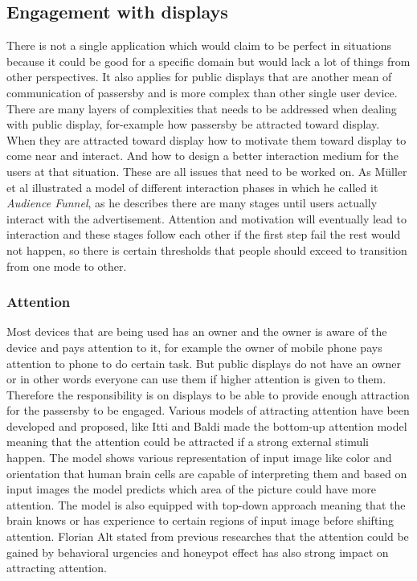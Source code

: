 \subsection{Engagement with displays}
There is not a single application which would claim to be perfect in situations because it could be good for a specific domain but would lack a lot of things from other perspectives. It also applies for public displays that are another mean of communication of passersby and is more complex than other single user device. There are many layers of complexities that needs to be addressed when dealing with public display, for-example how passersby be attracted toward display. When they are attracted toward display how to motivate them toward display to come near and interact. And how to design a better interaction medium for the users at that situation. These are all issues that need to be worked on. As Müller et al \cite{DesignSpace} illustrated a model of different interaction phases in which he called it \emph{Audience Funnel}, as he describes there are many stages until users actually interact with the advertisement. Attention and motivation will eventually lead to interaction and these stages follow each other if the first step fail the rest would not happen, so there is certain thresholds that people should exceed to transition from one mode to other. 


\subsubsection{Attention}
Most devices that are being used has an owner and the owner is aware of the device and pays attention to it, for example the owner of mobile phone pays attention to phone to do certain task. But public displays do not have an owner or in other words everyone can use them if higher attention is given to them. Therefore the responsibility is on displays to be able to provide enough attraction for the passersby to be engaged. 
Various models of attracting attention have been developed and proposed, like Itti and Baldi \cite{attention1} made the bottom-up attention model meaning that the attention could be attracted if a strong external stimuli happen. The model shows various representation of input image like color and orientation that human brain cells are capable of interpreting them and based on input images the model predicts which area of the picture could have more attention. The model is also equipped with top-down approach meaning that the brain knows or has experience to certain regions of input image before shifting attention.  Florian Alt \cite{pervasiv_ad} stated from previous researches that the attention could be gained by behavioral urgencies and honeypot effect has also strong impact on attracting attention.

